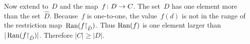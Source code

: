 \documentclass{test}  %
\begin{document}
\begin{problem}
\begin{exes}
\begin{answer}
  Now extend to~$D$ and the map~$\mbox{$f\colon D\to C$}$.
  The set~$D$ has one element more than the set~$\hat{D}$.
  Because~$f$ is one-to-one, the value~$f(d)$ is not in 
  the range of the restriction map~$\operatorname{Ran}({f}\mathord\upharpoonright_{\hat{D}})$.
  Thus $\operatorname{Ran}(f)$ is one element larger than
  $|\operatorname{Ran}({f}\mathord\upharpoonright_{\hat{D}})|$.
  Therefore $|C|\geq|D|$.  
\end{answer}
\end{exes}




\end{problem}
\end{document}
